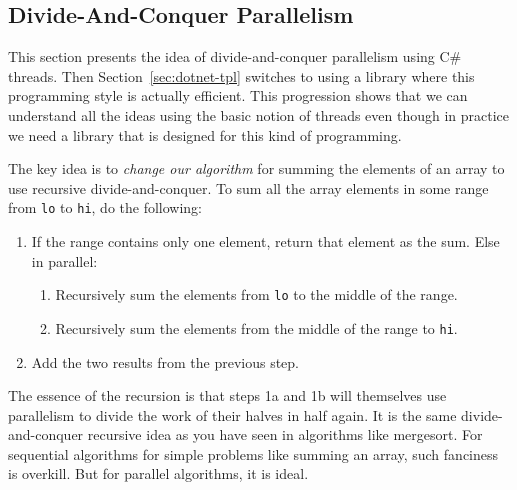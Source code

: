 \documentclass[10pt]{article}
\begin{document}
\subsection{Divide-And-Conquer Parallelism}
\label{sec:divide-conquer}

This section presents the idea of divide-and-conquer parallelism using
C\# threads.  Then Section~\ref{sec:dotnet-tpl} switches to using a
library where this programming style is actually efficient.  This
progression shows that we can understand all the ideas using the basic
notion of threads even though in practice we need a library that is
designed for this kind of programming.

The key idea is to \emph{change our algorithm} for summing the
elements of an array to use recursive divide-and-conquer.  To sum all
the array elements in some range from {\tt lo} to {\tt hi}, do the following:
\begin{enumerate}
\item If the range contains only one element, return that element
  as the sum.  Else in parallel:
  \begin{enumerate}
  \item Recursively sum the elements from {\tt lo} to the middle of the range.
  \item Recursively sum the elements from the middle of the range to {\tt hi}.
  \end{enumerate}
\item Add the two results from the previous step.
\end{enumerate}
The essence of the recursion is that steps 1a and 1b will themselves
use parallelism to divide the work of their halves in half again.  It
is the same divide-and-conquer recursive idea as you have seen in
algorithms like mergesort.  For sequential algorithms for simple
problems like summing an array, such fanciness is overkill.  But for
parallel algorithms, it is ideal.
\end{document}
